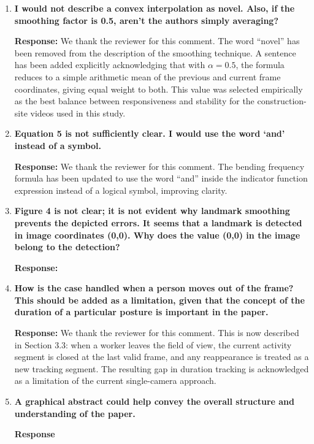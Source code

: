 \begin{enumerate}
    \textbf{Response:} We thank the reviewer for this comment. Individual citations have been added in Section 3.1: Wang et al.\ (CSPNet) for C2f blocks, He et al.\ for the SPPF module, Lin et al.\ for FPN, and Liu et al.\ for PAN. Molmo was already cited in Section 4.5 of the original submission.

    \item \textbf{I would not describe a convex interpolation as novel. Also, if the smoothing factor is 0.5, aren't the authors simply averaging?}

    \textbf{Response:} We thank the reviewer for this comment. The word ``novel'' has been removed from the description of the smoothing technique. A sentence has been added explicitly acknowledging that with $\alpha = 0.5$, the formula reduces to a simple arithmetic mean of the previous and current frame coordinates, giving equal weight to both. This value was selected empirically as the best balance between responsiveness and stability for the construction-site videos used in this study.

    \item \textbf{Equation 5 is not sufficiently clear. I would use the word `and' instead of a symbol.}

    \textbf{Response:} We thank the reviewer for this comment. The bending frequency formula has been updated to use the word ``and'' inside the indicator function expression instead of a logical symbol, improving clarity.

    \item \textbf{Figure 4 is not clear; it is not evident why landmark smoothing prevents the depicted errors. It seems that a landmark is detected in image coordinates (0,0). Why does the value (0,0) in the image belong to the detection?}

    \textbf{Response:}

    \item \textbf{How is the case handled when a person moves out of the frame? This should be added as a limitation, given that the concept of the duration of a particular posture is important in the paper.}

    \textbf{Response:} We thank the reviewer for this comment. This is now described in Section 3.3: when a worker leaves the field of view, the current activity segment is closed at the last valid frame, and any reappearance is treated as a new tracking segment. The resulting gap in duration tracking is acknowledged as a limitation of the current single-camera approach.

    \item \textbf{A graphical abstract could help convey the overall structure and understanding of the paper.}

    \textbf{Response}
\end{enumerate}

